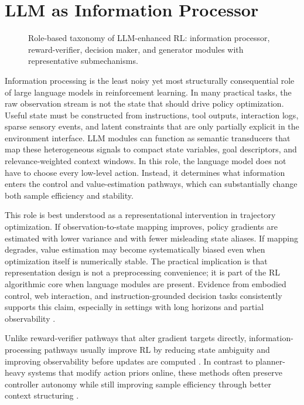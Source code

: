 ﻿\documentclass[conference]{IEEEtran}
\begin{document}
\section{LLM as Information Processor}
\begin{figure}[t]
\centering

\caption{Role-based taxonomy of LLM-enhanced RL: information processor, reward-verifier, decision maker, and generator modules with representative submechanisms.}
\label{fig:taxonomy}
\end{figure}

Information processing is the least noisy yet most structurally consequential role of large language models in reinforcement learning. In many practical tasks, the raw observation stream is not the state that should drive policy optimization. Useful state must be constructed from instructions, tool outputs, interaction logs, sparse sensory events, and latent constraints that are only partially explicit in the environment interface. LLM modules can function as semantic transducers that map these heterogeneous signals to compact state variables, goal descriptors, and relevance-weighted context windows. In this role, the language model does not have to choose every low-level action. Instead, it determines what information enters the control and value-estimation pathways, which can substantially change both sample efficiency and stability.

This role is best understood as a representational intervention in trajectory optimization. If observation-to-state mapping improves, policy gradients are estimated with lower variance and with fewer misleading state aliases. If mapping degrades, value estimation may become systematically biased even when optimization itself is numerically stable. The practical implication is that representation design is not a preprocessing convenience; it is part of the RL algorithmic core when language modules are present. Evidence from embodied control, web interaction, and instruction-grounded decision tasks consistently supports this claim, especially in settings with long horizons and partial observability \cite{arxiv_p_2205_12258,arxiv_p_2302_06692,arxiv_p_2311_13373,arxiv_p_2411_02337,arxiv_p_2601_12762,arxiv_p_2602_13559}.

Unlike reward-verifier pathways that alter gradient targets directly, information-processing pathways usually improve RL by reducing state ambiguity and improving observability before updates are computed \cite{arxiv_p_2602_06493,arxiv_p_2602_12579,arxiv_p_2310_12931}. In contrast to planner-heavy systems that modify action priors online, these methods often preserve controller autonomy while still improving sample efficiency through better context structuring \cite{arxiv_p_2204_01691,arxiv_p_2305_16291,arxiv_p_2602_07848}.
\end{document}
